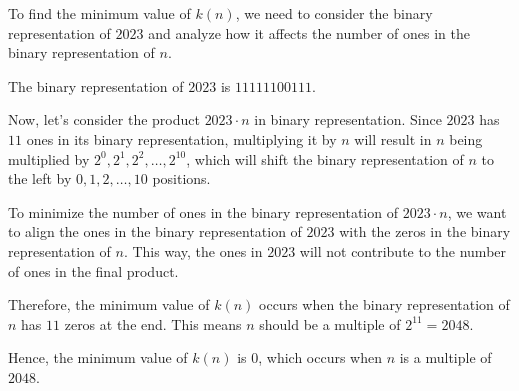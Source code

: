 To find the minimum value of $k(n)$, we need to consider the binary representation of $2023$ and analyze how it affects the number of ones in the binary representation of $n$.

The binary representation of $2023$ is $11111100111$. 

Now, let's consider the product $2023 \cdot n$ in binary representation. Since $2023$ has $11$ ones in its binary representation, multiplying it by $n$ will result in $n$ being multiplied by $2^0, 2^1, 2^2, \ldots, 2^{10}$, which will shift the binary representation of $n$ to the left by $0, 1, 2, \ldots, 10$ positions.

To minimize the number of ones in the binary representation of $2023 \cdot n$, we want to align the ones in the binary representation of $2023$ with the zeros in the binary representation of $n$. This way, the ones in $2023$ will not contribute to the number of ones in the final product.

Therefore, the minimum value of $k(n)$ occurs when the binary representation of $n$ has $11$ zeros at the end. This means $n$ should be a multiple of $2^{11} = 2048$. 

Hence, the minimum value of $k(n)$ is $\boxed{0}$, which occurs when $n$ is a multiple of $2048$.
